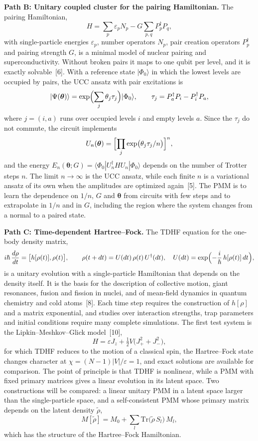 \documentclass[12pt,a4paper]{article}
\begin{document}
\textbf{Path B: Unitary coupled cluster for the pairing Hamiltonian.}
The pairing Hamiltonian,
\[
  H=\sum_{p}\varepsilon_p N_p-G\sum_{p,q}P_p^\dagger P_q ,
\]
with single-particle energies $\varepsilon_p$, number operators $N_p$,
pair creation operators $P_p^\dagger$ and pairing strength $G$, is a
minimal model of nuclear pairing and superconductivity.  Without
broken pairs it maps to one qubit per level, and it is exactly
solvable~[6].  With a reference state $|\Phi_0\rangle$ in which the
lowest levels are occupied by pairs, the UCC ansatz with pair
excitations is
\[
  |\Psi(\boldsymbol\theta)\rangle
  =\exp\Bigl(\sum_j\theta_j\tau_j\Bigr)|\Phi_0\rangle,\qquad
  \tau_j=P_a^\dagger P_i-P_i^\dagger P_a ,
\]
where $j=(i,a)$ runs over occupied levels $i$ and empty levels $a$.
Since the $\tau_j$ do not commute, the circuit implements
\[
  U_n(\boldsymbol\theta)
  =\Bigl[\prod_j\exp\bigl(\theta_j\tau_j/n\bigr)\Bigr]^{n},
\]
and the energy
$E_n(\boldsymbol\theta;G)=\langle\Phi_0|U_n^\dagger HU_n|\Phi_0\rangle$
depends on the number of Trotter steps $n$.  The limit $n\to\infty$ is
the UCC ansatz, while each finite $n$ is a variational ansatz of its
own when the amplitudes are optimized again~[5].  The PMM is to learn
the dependence on $1/n$, $G$ and $\boldsymbol\theta$ from circuits
with few steps and to extrapolate in $1/n$ and in $G$, including the
region where the system changes from a normal to a paired state.

\textbf{Path C: Time-dependent Hartree--Fock.}  The TDHF equation for
the one-body density matrix,
\[
  i\hbar\,\frac{d\rho}{dt}=\bigl[h[\rho(t)],\rho(t)\bigr],\qquad
  \rho(t+dt)=U(dt)\,\rho(t)\,U^\dagger(dt),\quad
  U(dt)=\exp\Bigl(-\frac{i}{\hbar}\,h[\rho(t)]\,dt\Bigr),
\]
is a unitary evolution with a single-particle Hamiltonian that depends
on the density itself.  It is the basis for the description of
collective motion, giant resonances, fusion and fission in nuclei, and
of mean-field dynamics in quantum chemistry and cold atoms~[8].  Each
time step requires the construction of $h[\rho]$ and a matrix
exponential, and studies over interaction strengths, trap parameters
and initial conditions require many complete simulations.  The first
test system is the Lipkin--Meshkov--Glick model~[10],
\[
  H=\varepsilon J_z+\tfrac12V\bigl(J_+^2+J_-^2\bigr),
\]
for which TDHF reduces to the motion of a classical spin, the
Hartree--Fock state changes character at $\chi=(N-1)|V|/\varepsilon=1$,
and exact solutions are available for comparison.  The point of
principle is that TDHF is nonlinear, while a PMM with fixed primary
matrices gives a linear evolution in its latent space.  Two
constructions will be compared: a linear unitary PMM in a latent space
larger than the single-particle space, and a self-consistent PMM whose
primary matrix depends on the latent density $\tilde\rho$,
\[
  M[\tilde\rho]=M_0+\sum_l\mathrm{Tr}\bigl(\tilde\rho\,S_l\bigr)\,M_l ,
\]
which has the structure of the Hartree--Fock Hamiltonian.
\end{document}
